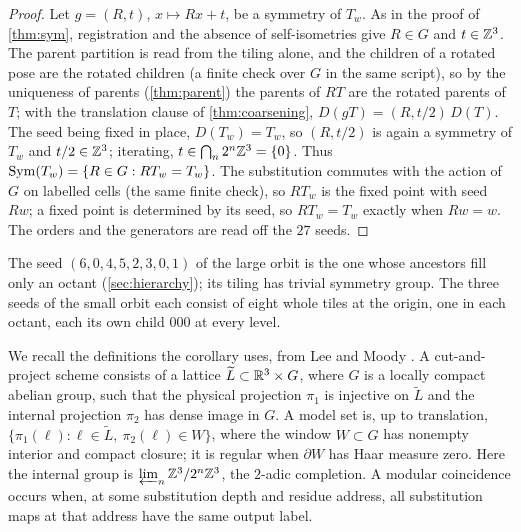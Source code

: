 
\begin{proof}
Let $g=(R,t)$, $x\mapsto Rx+t$, be a symmetry of $T_w$. As in the proof of \cref{thm:sym},
registration and the absence of self-isometries give $R\in G$ and $t\in\mathbb{Z}^3$. The parent
partition is read from the tiling alone, and the children of a rotated pose are the rotated
children (a finite check over $G$ in the same script), so by the uniqueness of parents
(\cref{thm:parent}) the parents of $RT$ are the rotated parents of $T$; with the translation
clause of \cref{thm:coarsening}, $D(gT)=(R,t/2)\,D(T)$. The seed being fixed in place,
$D(T_w)=T_w$, so $(R,t/2)$ is again a symmetry of $T_w$ and $t/2\in\mathbb{Z}^3$; iterating,
$t\in\bigcap_n2^n\mathbb{Z}^3=\{0\}$. Thus $\operatorname{Sym}(T_w)=\{R\in G: RT_w=T_w\}$. The substitution commutes
with the action of $G$ on labelled cells (the same finite check), so $RT_w$ is the fixed point
with seed $Rw$; a fixed point is determined by its seed, so $RT_w=T_w$ exactly when $Rw=w$. The
orders and the generators are read off the $27$ seeds.
\end{proof}

The seed $(6,0,4,5,2,3,0,1)$ of the large orbit is the one whose ancestors fill only an octant
(\cref{sec:hierarchy}); its tiling has trivial symmetry group. The three seeds of the small orbit
each consist of eight whole tiles at the origin, one in each octant, each its own child $000$ at
every level.

We recall the definitions the corollary uses, from Lee and Moody \cite{LM01}. A cut-and-project
scheme consists of a lattice $\widetilde L\subset\mathbb{R}^3\times G$, where $G$ is a locally compact
abelian group, such that the physical projection $\pi_1$ is injective on $\widetilde L$ and the
internal projection $\pi_2$ has dense image in $G$. A model set is, up to translation,
$\{\pi_1(\ell):\ell\in\widetilde L,\ \pi_2(\ell)\in W\}$, where the window $W\subset G$ has
nonempty interior and compact closure; it is regular when $\partial W$ has Haar measure zero.
Here the internal group is $\varprojlim_n\mathbb{Z}^3/2^n\mathbb{Z}^3$, the $2$-adic completion. A modular
coincidence occurs when, at some substitution depth and residue address, all substitution maps
at that address have the same output label.

